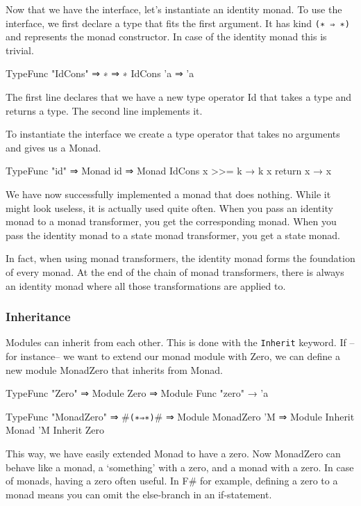 Now that we have the interface, let's instantiate an identity monad.
To use the interface, we first declare a type that fits the first argument.
It has kind \verb|(∗ ⇒ ∗)| and represents the monad constructor.
In case of the identity monad this is trivial.

\begin{code}
  TypeFunc "IdCons" ⇒ ∗ ⇒ ∗
  IdCons 'a ⇒ 'a
\end{code}

The first line declares that we have a new type operator Id that takes a type and returns a type.
The second line implements it. 

To instantiate the interface we create a type operator that takes no arguments and gives us a Monad.

\begin{code}
  TypeFunc "id" ⇒ Monad 
  id ⇒ Monad IdCons {
    x >>= k → k x
    return x → x
  }
\end{code}

We have now successfully implemented a monad that does nothing.
While it might look useless, it is actually used quite often.
When you pass an identity monad to a monad transformer, you get the corresponding monad.
When you pass the identity monad to a state monad transformer, you get a state monad.

In fact, when using monad transformers, the identity monad forms the foundation of every monad.
At the end of the chain of monad transformers, there is always an identity monad where all those transformations are applied to.

\subsubsection*{Inheritance}
Modules can inherit from each other.
This is done with the \verb|Inherit| keyword. 
If --for instance-- we want to extend our monad module with Zero,
we can define a new module MonadZero that inherits from Monad.

\begin{code}
  TypeFunc "Zero" ⇒ Module
  Zero ⇒ Module {
    Func "zero" → 'a
  }

  TypeFunc "MonadZero" ⇒ #\verb|(∗⇒∗)|# ⇒ Module
  MonadZero 'M ⇒ Module {
    Inherit Monad 'M
    Inherit Zero
  }
\end{code}

This way, we have easily extended Monad to have a zero.
Now MonadZero can behave like a monad, a `something' with a zero, and a monad with a zero.
In case of monads, having a zero often useful.
In F\# for example, defining a zero to a monad means you can omit the else-branch in an if-statement.
